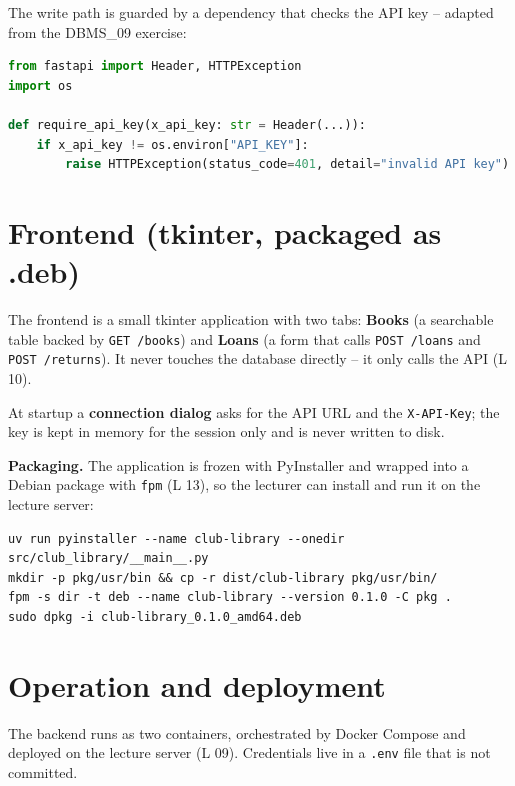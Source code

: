 \documentclass[11pt,a4paper]{article}
\begin{document}
The write path is guarded by a dependency that checks the API key -- adapted
from the DBMS\_09 exercise:

\begin{lstlisting}[language=Python, caption={API-key guard (adapted from DBMS\_09)}]
from fastapi import Header, HTTPException
import os

def require_api_key(x_api_key: str = Header(...)):
    if x_api_key != os.environ["API_KEY"]:
        raise HTTPException(status_code=401, detail="invalid API key")
\end{lstlisting}

\section{Frontend (tkinter, packaged as .deb)}

The frontend is a small tkinter application with two tabs: \textbf{Books} (a
searchable table backed by \texttt{GET /books}) and \textbf{Loans} (a form that
calls \texttt{POST /loans} and \texttt{POST /returns}). It never touches the
database directly -- it only calls the API (L 10).

At startup a \textbf{connection dialog} asks for the API URL and the
\texttt{X-API-Key}; the key is kept in memory for the session only and is never
written to disk.

\textbf{Packaging.} The application is frozen with PyInstaller and wrapped into a
Debian package with \texttt{fpm} (L 13), so the lecturer can install and run it
on the lecture server:

\begin{lstlisting}[caption={Building and installing the .deb}]
uv run pyinstaller --name club-library --onedir src/club_library/__main__.py
mkdir -p pkg/usr/bin && cp -r dist/club-library pkg/usr/bin/
fpm -s dir -t deb --name club-library --version 0.1.0 -C pkg .
sudo dpkg -i club-library_0.1.0_amd64.deb
\end{lstlisting}

\section{Operation and deployment}

The backend runs as two containers, orchestrated by Docker Compose and deployed
on the lecture server (L 09). Credentials live in a \texttt{.env} file that is
not committed.
\end{document}
